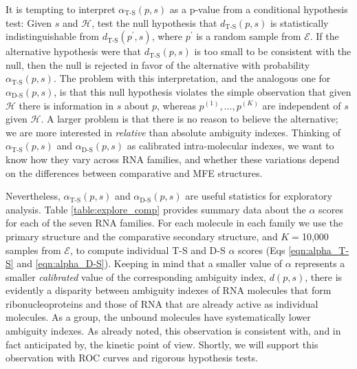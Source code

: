 \documentclass[10pt,letterpaper]{article}
\begin{document}
It is tempting to interpret $\alpha_\text{T-S}(p,s)$ as a p-value from a conditional hypothesis test: Given $s$ and $\mathcal{H}$, test the null hypothesis that $d_\text{T-S}(p,s)$ is statistically indistinguishable from  
$d_\text{T-S}(p^\prime,s)$, where $p^\prime$ is a random sample from $\mathcal{E}$. If the alternative hypothesis were that $d_\text{T-S}(p,s)$ is too small to be consistent with the null,  then the null is rejected in favor of the alternative with probability $\alpha_\text{T-S}(p,s)$. The problem with this interpretation, and the analogous one for $\alpha_\text{D-S}(p,s)$, is that this null hypothesis violates the simple observation that given $\mathcal{H}$ there is information in $s$ about $p$, whereas  $p^{(1)},\ldots,p^{(K)}$ are independent of $s$ given $\mathcal{H}$. A larger problem is that there is no reason to believe the alternative; we are more interested in {\em relative} than absolute ambiguity indexes. Thinking of  
$\alpha_\text{T-S}(p,s)$ and $\alpha_\text{D-S}(p,s)$ as calibrated intra-molecular indexes, we want to know how they vary across RNA families, and whether these variations depend on the differences between comparative and MFE structures.

Nevertheless, $\alpha_\text{T-S}(p,s)$ and $\alpha_\text{D-S}(p,s)$ are useful statistics for exploratory analysis.  Table \ref{table:explore_comp} provides summary data about the $\alpha$ scores for each of the seven RNA families. 
For each molecule in each family we use the primary structure and the comparative secondary structure, and $K=$10,000 samples from $\mathcal{E}$, to compute
individual T-S and D-S $\alpha$ scores (Eqs \ref{eqn:alpha_T-S} and \ref{eqn:alpha_D-S}). Keeping in mind that a smaller value of $\alpha$ represents a smaller {\em calibrated} value of the corresponding ambiguity index, $d(p,s)$, there is evidently a disparity between ambiguity indexes of RNA molecules that form ribonucleoproteins and those of RNA that are already active as individual molecules. As a group, the unbound molecules have systematically lower ambiguity indexes. As already noted, this observation is consistent with, and in fact anticipated by, the kinetic point of view. Shortly, we will support this observation with ROC curves and rigorous hypothesis tests.
\end{document}
